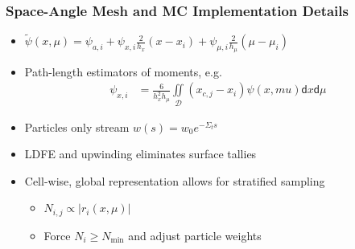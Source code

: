 \documentclass[xcolor=dvipsnames]{beamer}
\newcommand{\colb}[1]{{\color{blue} #1}}
\newlength{\wideitemsep}
\let\olditem\item
\renewcommand{\item}{\setlength{\itemsep}{\wideitemsep}\olditem}
\renewcommand{\d}{\mathsf{d}}
\begin{document}
\begin{frame}
    \frametitle{Space-Angle Mesh and MC Implementation Details}
    \noindent
    \begin{minipage}[t]{0.36\linewidth}
        \centering
    \end{minipage}%
    \begin{minipage}[t]{0.70\linewidth}
        \vspace{-1.6in}
        \begin{itemize}
            \item {\small $\displaystyle \tilde \psi(x,\mu) = \psi_{a,i} + \psi_{x,i}
                \frac{2}{h_{x}}(x-x_i) + \psi_{\mu,i}
            \frac{2}{h_{\mu}}(\mu-\mu_i)$}
        \item Path-length estimators of moments, e.g.
            {\small
            \begin{align*}
                \psi_{x,i} &= \frac{6}{h_{x}^2h_\mu}
             \iint\limits_\mathcal{D} (x_{c,j}-x_i) \psi(x,mu) \d x \d \mu 
        \end{align*}}    
        \end{itemize}
    \end{minipage}
    \begin{itemize}
        \item Particles \colb{only stream} $w(s)=w_0 e^{-\Sigma_t s}$
        \item LDFE and upwinding \colb{eliminates} surface tallies
    \item Cell-wise, global representation allows for \colb{stratified} sampling
        \begin{itemize}
            \item $N_{i,j} \propto{|r_i(x,\mu)|}$
            \item Force $N_i \geq N_{\min}$ and adjust particle weights
        \end{itemize}

    \end{itemize}

\end{frame}
\end{document}
